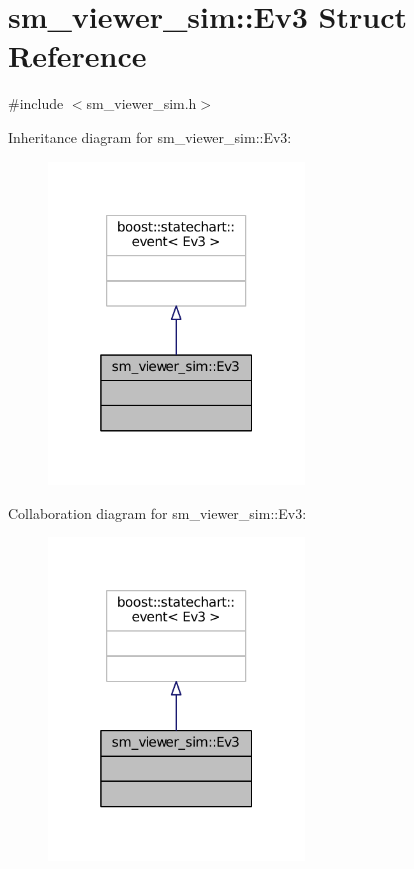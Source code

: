 \hypertarget{structsm__viewer__sim_1_1Ev3}{}\section{sm\+\_\+viewer\+\_\+sim\+:\+:Ev3 Struct Reference}
\label{structsm__viewer__sim_1_1Ev3}


{\ttfamily \#include $<$sm\+\_\+viewer\+\_\+sim.\+h$>$}



Inheritance diagram for sm\+\_\+viewer\+\_\+sim\+:\+:Ev3\+:
\nopagebreak
\begin{figure}[H]
\begin{center}
\leavevmode
\includegraphics[width=193pt]{structsm__viewer__sim_1_1Ev3__inherit__graph}
\end{center}
\end{figure}


Collaboration diagram for sm\+\_\+viewer\+\_\+sim\+:\+:Ev3\+:
\nopagebreak
\begin{figure}[H]
\begin{center}
\leavevmode
\includegraphics[width=193pt]{structsm__viewer__sim_1_1Ev3__coll__graph}
\end{center}
\end{figure}


